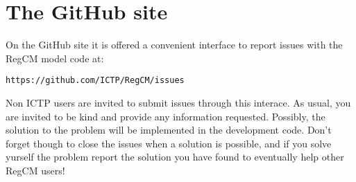 
\section{The GitHub site}

On the GitHub site it is offered a convenient interface to report issues with
the RegCM model code at:

\begin{Verbatim}
https://github.com/ICTP/RegCM/issues
\end{Verbatim}

Non ICTP users are invited to submit issues through this interace. As usual,
you are invited to be kind and provide any information requested. Possibly,
the solution to the problem will be implemented in the development code.
Don't forget though to close the issues when a solution is possible, and if
you solve yurself the problem report the solution you have found to eventually
help other RegCM users!
